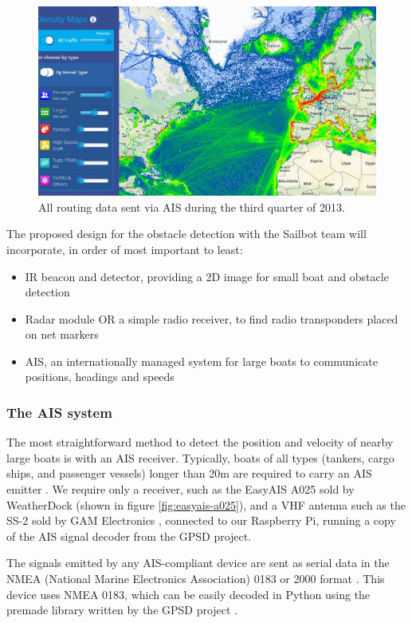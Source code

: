 \begin{figure}
\includegraphics[width=120mm,natwidth=540,natheight=459]{"./image/AIS-tracking-Q3-2013"}
\caption[AIS- captured tracking data for Q3 2013]{\label{fig:ais-emitters-amortized}All routing data sent via AIS during the third quarter of 2013.}
\end{figure}


The proposed design for the obstacle detection with the Sailbot team will incorporate, in order of most important to least:
\begin{itemize}
\item IR beacon and detector, providing a 2D image for small boat and obstacle detection
\item Radar module OR a simple radio receiver, to find radio transponders placed on net markers
\item AIS, an internationally managed system for large boats to communicate positions, headings and speeds
\end{itemize}

\subsubsection{\label{sec:method:proposed-design:ais}The AIS system}
The most straightforward method to detect the position and velocity of nearby large boats is with an AIS receiver. Typically, boats of all types (tankers, cargo ships, and passenger vessels) longer than 20m are required to carry an AIS emitter \cite{us-ais-requirements}. We require only a receiver, such as the EasyAIS A025 sold by WeatherDock (shown in figure \ref{fig:easyais-a025}), and a VHF antenna such as the SS-2 sold by GAM Electronics \cite{gam-electronics__ss-2}, connected to our Raspberry Pi, running a copy of the AIS signal decoder from the GPSD project.

The signals emitted by any AIS-compliant device are sent as serial data in the NMEA (National Marine Electronics Association) 0183 or 2000 format \cite{nmea__standards}. This device uses NMEA 0183, which can be easily decoded in Python using the premade library written by the GPSD project \cite{gpsd__overview}.

